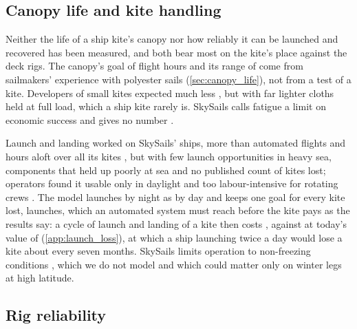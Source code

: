 \subsection{Canopy life and kite handling}
\label{sec:disc_kite}

Neither the life of a ship kite's canopy nor how reliably it can be launched and recovered has been measured, and both bear most on the kite's place against the deck rigs. The canopy's goal of  flight hours and its range of  come from sailmakers' experience with polyester sails (\cref{sec:canopy_life}), not from a test of a kite. Developers of small kites expected much less \citep{vandervlugt2013,bormann2013}, but with far lighter cloths held at full load, which a ship kite rarely is. SkySails calls fatigue a limit on economic success and gives no number \citep{paulig2013}.

Launch and landing worked on SkySails' ships, more than  automated flights and  hours aloft over all its kites \citep{skysails2018}, but with few launch opportunities in heavy sea, components that held up poorly at sea and no published count of kites lost; operators found it usable only in daylight and too labour-intensive for rotating crews \citep{cedelft2016}. The model launches by night as by day and keeps one goal for every kite lost,  launches, which an automated system must reach before the kite pays as the results say: a cycle of launch and landing of a  kite then costs , against  at today's value of  (\cref{app:launch_loss}), at which a ship launching twice a day would lose a kite about every seven months. SkySails limits operation to non-freezing conditions \citep{paulig2013}, which we do not model and which could matter only on winter legs at high latitude. 

\subsection{Rig reliability}
\label{sec:disc_reliability}

